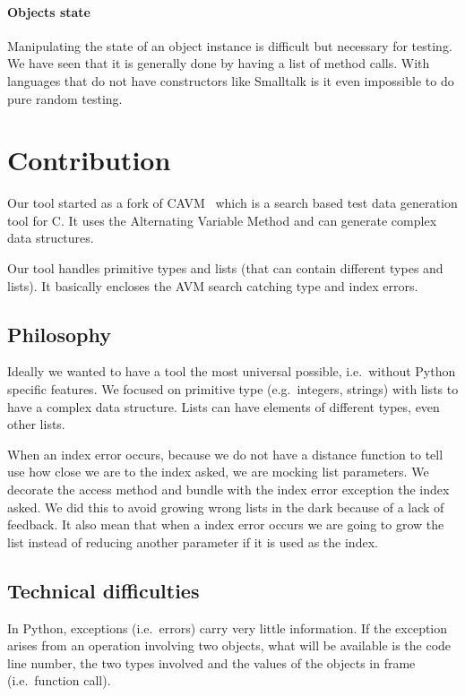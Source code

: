 \documentclass{llncs2e/llncs}
\begin{document}
\paragraph{Objects state} Manipulating the state of an object instance is
difficult but necessary for testing. We have seen that it is generally done by
having a list of method calls. With languages that do not have constructors like
Smalltalk is it even impossible to do pure random testing.


\section{Contribution}
\label{contribution}

Our tool started as a fork of CAVM~\cite{Kim2017ts} which is a search based test
data generation tool for C. It uses the Alternating Variable Method and can
generate complex data structures.

Our tool handles primitive types and lists (that can contain different types and
lists). It basically encloses the AVM search catching type and index errors.

\subsection{Philosophy}
\label{philosophy}

Ideally we wanted to have a tool the most universal possible, i.e.\ without
Python specific features. We focused on primitive type (e.g.\ integers, strings)
with lists to have a complex data structure. Lists can have elements of
different types, even other lists.

When an index error occurs, because we do not have a distance function to tell
use how close we are to the index asked, we are mocking list parameters. We
decorate the access method and bundle with the index error exception the index
asked. We did this to avoid growing wrong lists in the dark because of a lack of
feedback. It also mean that when a index error occurs we are going to grow the
list instead of reducing another parameter if it is used as the index.

\subsection{Technical difficulties}
\label{tech_difficulties}

In Python, exceptions (i.e.\ errors) carry very little information. If the
exception arises from an operation involving two objects, what will be available
is the code line number, the two types involved and the values of the objects in
frame (i.e.\ function call).
\end{document}
